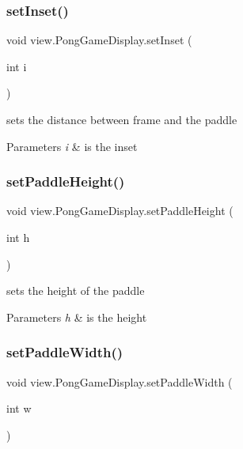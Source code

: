 \subsubsection{\texorpdfstring{set\+Inset()}{setInset()}}
{\footnotesize\ttfamily void view.\+Pong\+Game\+Display.\+set\+Inset (\begin{DoxyParamCaption}\item[{int}]{i }\end{DoxyParamCaption})}



sets the distance between frame and the paddle 


\begin{DoxyParams}{Parameters}
{\em i} & is the inset \\
\hline
\end{DoxyParams}
\hypertarget{classview_1_1_pong_game_display_a5c855e1e459838b82e976cd957da5cc5}{}\label{classview_1_1_pong_game_display_a5c855e1e459838b82e976cd957da5cc5} 
\subsubsection{\texorpdfstring{set\+Paddle\+Height()}{setPaddleHeight()}}
{\footnotesize\ttfamily void view.\+Pong\+Game\+Display.\+set\+Paddle\+Height (\begin{DoxyParamCaption}\item[{int}]{h }\end{DoxyParamCaption})}



sets the height of the paddle 


\begin{DoxyParams}{Parameters}
{\em h} & is the height \\
\hline
\end{DoxyParams}
\hypertarget{classview_1_1_pong_game_display_ac42d38f9ed29e2ab2bec6c7da46f1c0e}{}\label{classview_1_1_pong_game_display_ac42d38f9ed29e2ab2bec6c7da46f1c0e} 
\subsubsection{\texorpdfstring{set\+Paddle\+Width()}{setPaddleWidth()}}
{\footnotesize\ttfamily void view.\+Pong\+Game\+Display.\+set\+Paddle\+Width (\begin{DoxyParamCaption}\item[{int}]{w }\end{DoxyParamCaption})}



